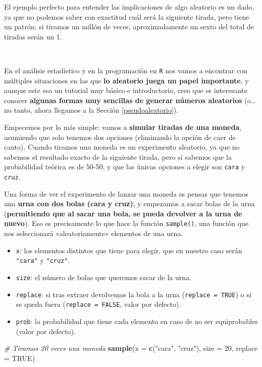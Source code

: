 \documentclass[11pt,]{book}
\newenvironment{Shaded}{\begin{snugshade}}{\end{snugshade}}
\newcommand{\CommentTok}[1]{\textcolor[rgb]{0.37,0.37,0.37}{\textit{#1}}}
\newcommand{\DataTypeTok}[1]{\textcolor[rgb]{0.27,0.27,0.27}{#1}}
\newcommand{\DecValTok}[1]{\textcolor[rgb]{0.06,0.06,0.06}{#1}}
\newcommand{\KeywordTok}[1]{\textcolor[rgb]{0.27,0.27,0.27}{\textbf{#1}}}
\newcommand{\NormalTok}[1]{#1}
\newcommand{\OtherTok}[1]{\textcolor[rgb]{0.37,0.37,0.37}{#1}}
\newcommand{\StringTok}[1]{\textcolor[rgb]{0.5,0.5,0.5}{#1}}
\providecommand{\tightlist}{%
  \setlength{\itemsep}{0pt}\setlength{\parskip}{0pt}}
\begin{document}
El ejemplo perfecto para entender las implicaciones de algo aleatorio es un dado, ya que no podemos saber con exactitud cuál será la siguiente tirada, pero tiene un patrón: si tiramos un millón de veces, aproximadamente un sexto del total de tiradas serán un 1.

~

En el análisis estadístico y en la programación en \texttt{R} nos vamos a encontrar con múltiples situaciones en las que \textbf{lo aleatorio juega un papel importante}, y aunque este sea un tutorial muy básico e introductorio, creo que es interesante conocer \textbf{algunas formas muy sencillas de generar números aleatorios} (o\ldots{}no tanto, ahora llegamos a la Sección \ref{pseudoaleatorio}).

Empecemos por lo más simple: vamos a \textbf{simular tiradas de una moneda}, asumiendo que solo tenemos dos opciones (eliminando la opción de caer de canto). Cuando tiramos una moneda es un experimento aleatorio, ya que no sabemos el resultado exacto de la siguiente tirada, pero sí sabemos que la probabilidad teórica es de 50-50, y que las únicas opciones a elegir son \texttt{cara} y \texttt{cruz}.

Una forma de ver el experimento de lanzar una moneda es pensar que tenemos una \textbf{urna con dos bolas (cara y cruz)}, y empezamos a sacar bolas de la urna (\textbf{permitiendo que al sacar una bola, se pueda devolver a la urna de nuevo}). Eso es precisamente lo que hace la función \texttt{sample()}, una función que nos seleccionará «aleatoriamente» elementos de una urna.

\begin{itemize}
\tightlist
\item
  \texttt{x}: los elementos distintos que tiene para elegir, que en nuestro caso serán \texttt{"cara"} y \texttt{"cruz"}.
\item
  \texttt{size}: el número de bolas que queremos sacar de la urna.
\item
  \texttt{replace}: si tras extraer devolvemos la bola a la urna (\texttt{replace\ =\ TRUE}) o si se queda fuera (\texttt{replace\ =\ FALSE}, valor por defecto).
\item
  \texttt{prob}: la probabilidad que tiene cada elemento en caso de no ser equiprobables (valor por defecto).
\end{itemize}

\begin{Shaded}
\begin{Highlighting}[]
\CommentTok{# Tiramos 20 veces una moneda}
\KeywordTok{sample}\NormalTok{(}\DataTypeTok{x =} \KeywordTok{c}\NormalTok{(}\StringTok{"cara"}\NormalTok{, }\StringTok{"cruz"}\NormalTok{), }\DataTypeTok{size =} \DecValTok{20}\NormalTok{, }\DataTypeTok{replace =} \OtherTok{TRUE}\NormalTok{)}
\end{Highlighting}
\end{Shaded}
\end{document}
